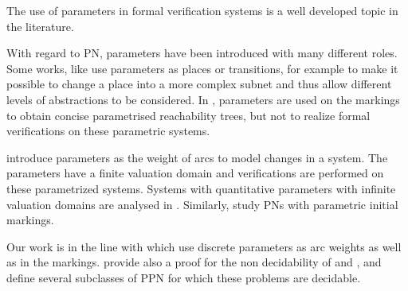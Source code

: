 The use of parameters in formal verification systems is a well developed topic in the literature.

With regard to \ac{PN}, parameters have been introduced with many different roles.
Some works, like \cite{Christensen97} use parameters as places or transitions, for example to make it possible to change a place into a more complex subnet and thus allow different levels of abstractions to be considered.
In \cite{Lindqvist91}, parameters are used on the markings to obtain concise parametrised reachability trees, but not to realize formal verifications on these parametric systems.

\cite{Badouel99} introduce parameters as the weight of arcs to model changes in a system.
The parameters have a finite valuation domain and verifications are performed on these parametrized systems.
Systems with quantitative parameters with infinite valuation domains are analysed in \cite{Abdulla13}.
Similarly, \cite{Marsan94} study \acp{PN} with parametric initial markings.

Our work is in the line with \cite{David17} which use discrete parameters as arc weights as well as in the markings.
\cite{David17} provide also a proof for the non decidability of \Ucov and \Ecov, and define several subclasses of \ac{PPN} for which these problems are decidable.



